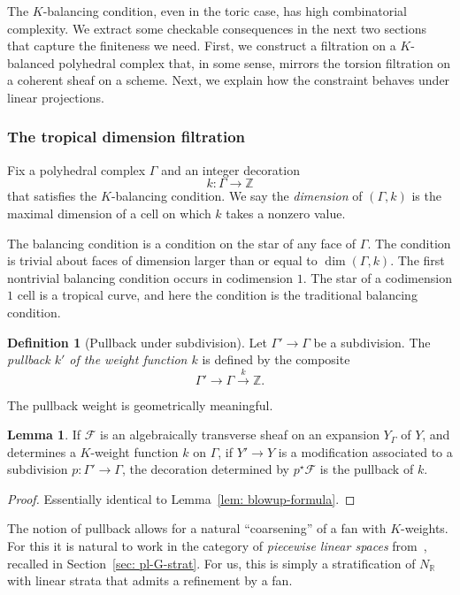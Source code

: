 \documentclass[11pt]{amsart}
\theoremstyle{definition}
\theoremstyle{definition}
\newtheorem{lemma}[theorem]{Lemma}
\newtheorem{definition}[theorem]{Definition}
\newcommand{\RR}{\mathbb{R}}
\begin{document}
The $K$-balancing condition, even in the toric case, has high combinatorial complexity. We extract some checkable consequences in the next two sections that capture the finiteness we need. First, we construct a filtration on a $K$-balanced polyhedral complex that, in some sense, mirrors the torsion filtration on a coherent sheaf on a scheme. Next, we explain how the constraint behaves under linear projections. 

\subsubsection{The tropical dimension filtration} Fix a polyhedral complex $\Gamma$ and an integer decoration
\[
k\colon \Gamma\to \mathbb Z
\]
that satisfies the $K$-balancing condition. We say the {\it dimension} of $(\Gamma,k)$ is the maximal dimension of a cell on which $k$ takes a nonzero value. 

The balancing condition is a condition on the star of any face of $\Gamma$. The condition is trivial about faces of dimension larger than or equal to $\dim (\Gamma,k)$. The first nontrivial balancing condition occurs in codimension $1$. The star of a codimension $1$ cell is a tropical curve, and here the condition is the traditional balancing condition. 

\begin{definition}[Pullback under subdivision]
Let $\Gamma'\to \Gamma$ be a subdivision. The {\it pullback $k'$ of the weight function $k$} is defined by the composite
\[
\Gamma'\to\Gamma\xrightarrow{k}\mathbb Z.
\]
\end{definition}

The pullback weight is geometrically meaningful. 

\begin{lemma}
If $\mathcal F$ is an algebraically transverse sheaf on an expansion $Y_\Gamma$ of $Y$, and determines a $K$-weight function $k$ on $\Gamma$, if $Y'\to Y$ is a modification associated to a subdivision $p\colon \Gamma'\to\Gamma$, the decoration determined by $p^\star\mathcal F$ is the pullback of $k$. 
\end{lemma}

\begin{proof}
Essentially identical to Lemma~\ref{lem: blowup-formula}.
\end{proof}

The notion of pullback allows for a natural ``coarsening'' of a fan with $K$-weights. For this it is natural to work in the category of {\it piecewise linear spaces} from~\cite{Logquot}, recalled in Section~\ref{sec: pl-G-strat}. For us, this is simply a stratification of $N_{\mathbb R}$ with linear strata that admits a refinement by a fan. %
\end{document}
